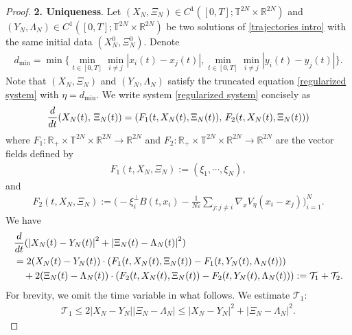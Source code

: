 \documentclass[10pt,a4paper]{amsart}
\def\dd{{\rm d}}
\begin{document}
\begin{proof}
\smallskip
\textbf{2. Uniqueness}. Let $(X_{N},\Xi_{N})\in C^{1}([0,T];\mathbb{T}^{2N}\times \mathbb{R}^{2N})$ and $(Y_{N},\Lambda_{N})\in C^{1}([0,T];\mathbb{T}^{2N}\times \mathbb{R}^{2N})$ be two solutions of \eqref{trajectories intro} with the same initial data $(X_{N}^{0},\Xi_{N}^{0})$. Denote 
\begin{align*}
d_{\min}=\min\Big\{\underset{t\in [0,T]}{\min}\underset{i\neq j}{\min}\left\vert x_{i}(t)-x_{j}(t)\right\vert,\underset{t\in[0,T]}{\min}\min_{i\neq j} \left\vert y_{i}(t)-y_{j}(t)\right\vert\Big\}.     
\end{align*}
Note that $(X_{N},\Xi_{N})$ and $(Y_{N},\Lambda_{N})$ satisfy the truncated equation \eqref{regularized system} with $\eta=d_{\min}$. 
We write system \eqref{regularized system} concisely as 
\begin{align*}
\frac{\dd}{\dd t}(X_{N}(t),\,\Xi_{N}(t))
=(F_{1}(t,X_{N}(t),\Xi_{N}(t)),\,F_{2}(t,X_{N}(t),\Xi_{N}(t)))  \end{align*}
where $F_{1}:\mathbb{R}_{+}\times \mathbb{T}^{2N}\times \mathbb{R}^{2N}\rightarrow \mathbb{R}^{2N}$ and $F_{2}:\mathbb{R}_{+}\times \mathbb{T}^{2N}\times \mathbb{R}^{2N}\rightarrow \mathbb{R}
^{2N}$ are the vector fields defined by 
\begin{align*}
F_{1}(t,X_{N},\Xi_{N}):= (\xi_{1},\cdots\!,\xi_{N}),    
\end{align*}
and 
\begin{align*}
F_{2}(t,X_{N},\Xi_{N}):=\Big(-\xi_{i}^{\perp}B(t,x_{i})-\frac{1}{N\varepsilon}\sum_{j:j\neq i}\nabla_{x}V_{\eta}(x_{i}-x_{j})\Big)_{i=1}^{N}.
\end{align*}
We have 
\begin{align*}
&\frac{\dd}{\dd t}(\left\vert X_{N}(t)-Y_{N}(t)\right\vert^{2}+\left\vert \Xi_{N}(t)-\Lambda_{N}(t)\right\vert^{2})\\
&=2(X_{N}(t)-Y_{N}(t))\cdot (F_{1}(t,X_{N}(t),\Xi_{N}(t))-F_{1}(t,Y_{N}(t),\Lambda_{N}(t)))\\
&\quad+2(\Xi_{N}(t)-\Lambda_{N}(t))\cdot (F_{2}(t,X_{N}(t),\Xi_{N}(t))-F_{2}(t,Y_{N}(t),\Lambda_{N}(t))):= \mathcal{T}_{1}+\mathcal{T}_{2}.    \end{align*}
For brevity, we omit the time variable in what follows. We estimate $\mathcal{T}_{1}$:\begin{align}
\mathcal{T}_{1}\leq 2\left\vert X_{N}-Y_{N}\right\vert\left\vert \Xi_{N}-\Lambda_{N}\right\vert\leq \left\vert X_{N}-Y_{N}\right\vert^{2}+\left\vert \Xi_{N}-\Lambda_{N}\right\vert^{2}.  \label{T1 estimate}        
\end{align}

\end{proof}
\end{document}
